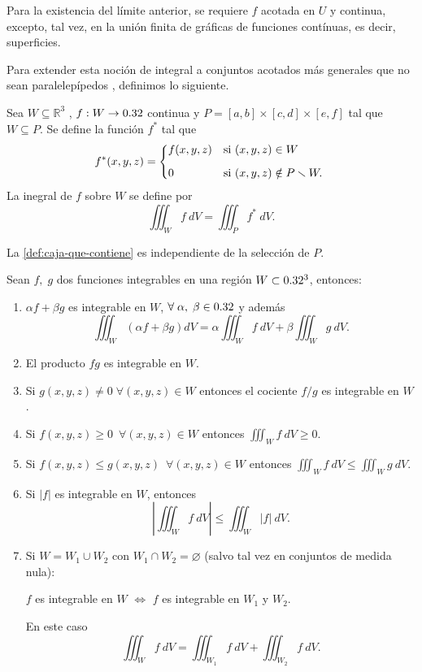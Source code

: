 \begin{obs}
Para la existencia del límite anterior, se requiere $f$ acotada en $U$ y continua, excepto, tal vez, en la unión finita de gráficas de funciones 
contínuas, es decir, superficies.
\end{obs}


Para extender esta noci\'on de integral a  conjuntos acotados m\'as generales que no sean  paralelepípedos , definimos lo siguiente. 

\begin{definition}\label{def:caja-que-contiene} Sea $W  \subseteq  \mathbb{R}^3$ , $f:W\to0.32$ continua y  $P = [a, b] \times [c, d] \times [e, f]$ tal que $W  \subseteq  P$.  Se define la funci\'on $f^*$ tal que
\[
    f^*(x,y,z)=
    \begin{dcases*}
        f(x,y,z) & si $(x,y,z)\in W$ \\[.2cm]
        0        & si $(x,y,z)\notin P\smallsetminus W.$
    \end{dcases*}
\]
La inegral de  $f$ sobre $W$ se define por 
\[
    \iiint_W f\:dV=\iiint_P f^*\:dV.  
\]
\end{definition}

\begin{obs} 
   La \autoref{def:caja-que-contiene} es independiente de la selecci\'on de $P$.
\end{obs}

\begin{propertie}
    Sean $f,\;g$ dos funciones integrables en una regi\'on $W\subset0.32^3$, entonces:
    \begin{enumerate}
        \item[i.] $\alpha f+\beta g$ es integrable en $W$, $\forall\;\alpha,\;\beta\in0.32$ y adem\'as
        \[
            \iiint_W \left(\alpha f+\beta g\right)dV=\alpha\iiint_W f\:dV+\beta\iiint_W g\:dV.
        \]
        \item[ii.] El producto $fg$ es integrable en $W$.
        \item[iii.] Si $g(x,y,z) \neq  0\;\forall(x,y,z)\in W$ entonces el cociente $f/g$ es integrable en $W$.
        \item[iv.] Si $f(x,y,z) \geq 0  \;\: \forall(x,y,z)\in W$ entonces  $\iiint_W f\:dV\geq0$.
        \item[v.]Si $f(x,y,z) \leq g(x,y,z) \;\: \forall(x,y,z)\in W$ entonces $\iiint_W f\:dV\leq\iiint_W g\:dV.$
        \item[vi.]Si $|f|$ es integrable en $W$, entonces 
        \[
            \left|\iiint_W f\:dV\right|\leq\iiint_W|f|\:dV.  
        \]    
        \item[vii.] Si $W=W_1\cup W_2$  con $W_1\cap W_2 = \varnothing$  (salvo tal vez en conjuntos de medida nula): 
        
        $f$ es integrable en $W$ $\iff$ $f$ es integrable en $W_1$ y $W_2$.
        
         En este caso 
        \[
            \iiint_W f\:dV=\iiint_{W_1} f\:dV+\iiint_{W_2}f\:dV.    
        \]
    \end{enumerate}
\end{propertie}

